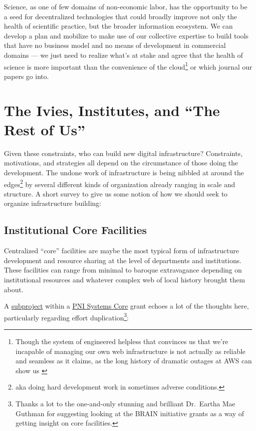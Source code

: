 Science, as one of few domains of non-economic labor, has the
opportunity to be a seed for decentralized technologies that could
broadly improve not only the health of scientific practice, but the
broader information ecosystem. We can develop a plan and mobilize to
make use of our collective expertise to build tools that have no
business model and no means of development in commercial domains --- we
just need to realize what's at stake and agree that the health of
science is more important than the convenience of the cloud\footnote{Though
  the system of engineered helpless that convinces us that we're
  incapable of managing our own web infrastructure is not actually as
  reliable and seamless as it claims, as the long history of dramatic
  outages at AWS can show us \citep{lawlerAmazonServerOutage2021, hutchinsonAmazonWebServices2012} } or which journal our papers go
into.

\hypertarget{the-ivies-institutes-and-the-rest-of-us}{%
\section{The Ivies, Institutes, and ``The Rest of
Us''}\label{the-ivies-institutes-and-the-rest-of-us}}

Given these constraints, who can build new digital infrastructure?
Constraints, motivations, and strategies all depend on the circumstance
of those doing the development. The undone work of infrastructure is
being nibbled at around the edges\footnote{aka doing hard development
  work in sometimes adverse conditions.} by several different kinds of
organization already ranging in scale and structure. A short survey to
give us some notion of how we should seek to organize infrastructure
building:

\hypertarget{institutional-core-facilities}{%
\subsection{Institutional Core
Facilities}\label{institutional-core-facilities}}

Centralized ``core'' facilities are maybe the most typical form of
infrastructure development and resource sharing at the level of
departments and institutions. These facilities can range from minimal to
baroque extravagance depending on institutional resources and whatever
complex web of local history brought them about.

A
\href{https://reporter.nih.gov/project-details/9444124\#sub-Projects}{subproject}
within a
\href{https://projectreporter.nih.gov/project_info_details.cfm?aid=9444124}{PNI
Systems Core} grant echoes a lot of the thoughts here, particularly
regarding effort duplication\footnote{Thanks a lot to the one-and-only
  stunning and brilliant Dr.~Eartha Mae Guthman for suggesting looking
  at the BRAIN initiative grants as a way of getting insight on core
  facilities.}:

